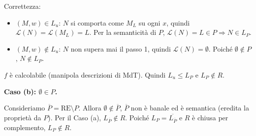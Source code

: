 {Correttezza:
\begin{itemize}
  \item[$ (\Rightarrow) $] $ (M,w) \in L_u $: $ N $ si comporta come $ M_L $ su ogni $ x $, quindi $ \mathcal{L}(N) = \mathcal{L}(M_L) = L $. Per la semanticità di $ P $, $ \mathcal{L}(N) = L \in P \Rightarrow N \in L_P $.
  \item[$ (\Leftarrow) $] $ (M,w) \notin L_u $: $ N $ non supera mai il passo 1, quindi $ \mathcal{L}(N) = \emptyset $. Poiché $ \emptyset \notin P $, $ N \notin L_P $.
\end{itemize}
$ f $ è calcolabile (manipola descrizioni di MdT). Quindi $ L_u \leq L_P $ e $ L_P \notin R $.

\medskip
\textbf{Caso (b): $ \emptyset \in P $.}

Consideriamo $ \overline{P} = \mathrm{RE} \setminus P $. Allora $ \emptyset \notin \overline{P} $, $ \overline{P} $ non è banale ed è semantica (eredita la proprietà da $ P $). Per il Caso (a), $ L_{\overline{P}} \notin R $. Poiché $ L_P = \overline{L_{\overline{P}}} $ e $ R $ è chiusa per complemento, $ L_P \notin R $.
}

% 
